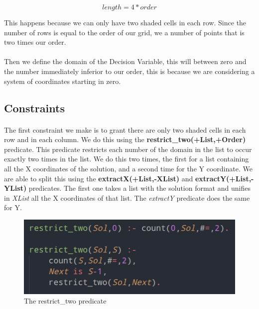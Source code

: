 \documentclass[runningheads]{llncs}
\begin{document}
\begin{equation}
    length = 4 * order
\end{equation}

This happens because we can only have two shaded cells in each row. Since the number of rows is equal to the order of our
grid, we a number of points that is two times our order.

\paragraph{}
Then we define the domain of the Decision Variable, this will between zero and the number immediately inferior to our order,
this is because we are considering a system of coordinates starting in zero.

\subsection{Constraints}
\paragraph{}
The first constraint we make is to grant there are only two shaded cells in each row and in each column. We do this 
using the \textbf{restrict\_two(+List,+Order)} predicate. This predicate restricts each number of the domain in the list 
to occur exactly two times in the list. We do this two times, the first for a list containing all the X coordinates of the
solution, and a second time for the Y coordinate. We are able to split this using the \textbf{extractX(+List,-XList)} and
\textbf{extractY(+List,-YList)} predicates. The first one takes a list with the solution format and unifies in 
\textit{XList} all the X coordinates of that list. The \textit{extractY} predicate does the same for Y.

\begin{figure}
    \begin{center}
        \includegraphics[scale=0.5]{images/restrict_two.png}
        \caption{The restrict\_two predicate} \label{fig2}
    \end{center}
\end{figure}
\end{document}
